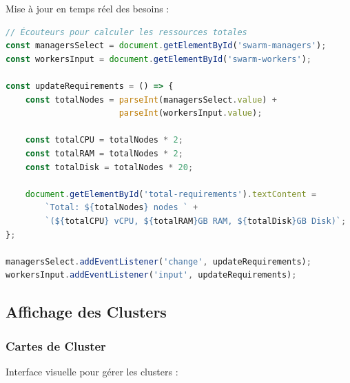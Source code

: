 \documentclass[12pt,a4paper]{article}
\begin{document}
Mise à jour en temps réel des besoins :

\begin{lstlisting}[language=JavaScript,caption=Calcul ressources (swarm.js)]
// Écouteurs pour calculer les ressources totales
const managersSelect = document.getElementById('swarm-managers');
const workersInput = document.getElementById('swarm-workers');

const updateRequirements = () => {
    const totalNodes = parseInt(managersSelect.value) + 
                       parseInt(workersInput.value);
    
    const totalCPU = totalNodes * 2;
    const totalRAM = totalNodes * 2;
    const totalDisk = totalNodes * 20;
    
    document.getElementById('total-requirements').textContent = 
        `Total: ${totalNodes} nodes ` +
        `(${totalCPU} vCPU, ${totalRAM}GB RAM, ${totalDisk}GB Disk)`;
};

managersSelect.addEventListener('change', updateRequirements);
workersInput.addEventListener('input', updateRequirements);
\end{lstlisting}

\subsection{Affichage des Clusters}

\subsubsection{Cartes de Cluster}

Interface visuelle pour gérer les clusters :
\end{document}
